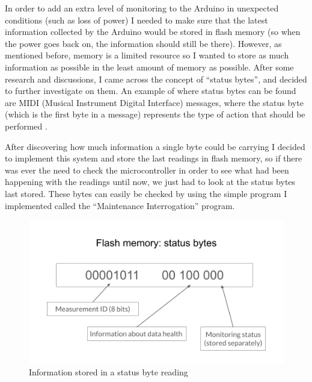 \documentclass[12pt]{article}
\begin{document}
In order to add an extra level of monitoring to the Arduino in unexpected conditions (such as loss of power) I needed to make sure that the latest information collected by the Arduino would be stored in flash memory (so when the power goes back on, the information should still be there). However, as mentioned before, memory is a limited resource so I wanted to store as much information as possible in the least amount of memory as possible. After some research and discussions, I came across the concept of ``status bytes'', and decided to further investigate on them. An example of where status bytes can be found are MIDI (Musical Instrument Digital Interface) messages, where the status byte (which is the first byte in a message) represents the type of action that should be performed \cite{recording-blogs} \cite{midi}. \par 

After discovering how much information a single byte could be carrying I decided to implement this system and store the last readings in flash memory, so if there was ever the need to check the microcontroller in order to see what had been happening with the readings until now, we just had to look at the status bytes last stored. These bytes can easily be checked by using the simple program I implemented called the ``Maintenance Interrogation'' program. \par 

\begin{figure}[h]
\includegraphics[scale=0.35]{status-byte-info}
\centering
\caption{Information stored in a status byte reading}
\label{fig:status-byte-info}
\end{figure}
\end{document}
